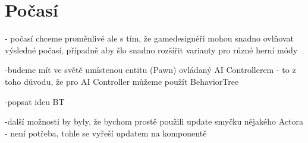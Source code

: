 
\section{Počasí}

- počasí chceme proměnlivé ale s tím, že gamedesignéři mohou snadno ovlňovat výsledné počasí, případně aby šlo snadno rozšířit varianty pro různé herní módy

-budeme mít ve světě umístenou entitu (Pawn) ovládaný AI Controllerem - to z toho důvodu, že pro AI Controller můžeme použít BehaviorTree

-popsat ideu BT

-další možnosti by byly, že bychom prostě použili update smyčku nějakého Actora - není potřeba, tohle se vyřeší updatem na komponentě